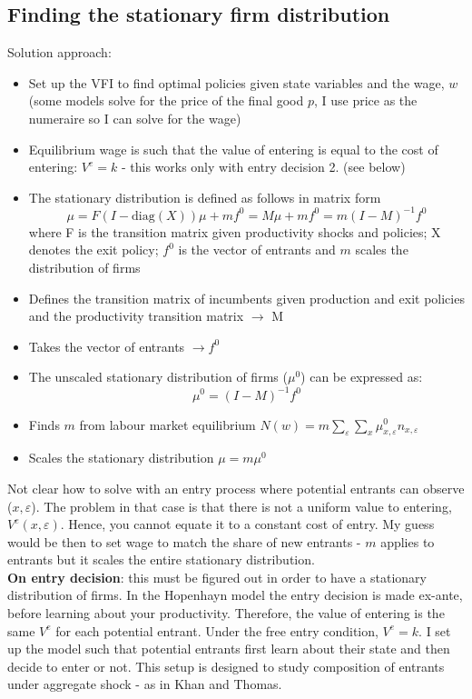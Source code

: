 \documentclass[12pt]{article}
\begin{document}
\subsection*{Finding the stationary firm distribution}
Solution approach:
\begin{itemize} \setlength\itemsep{0em}
    \item Set up the VFI to find optimal policies given state variables and the wage, $w$ (some models solve for the price of the final good $p$, I use price as the numeraire so I can solve for the wage)
    \item Equilibrium wage is such that the value of entering is equal to the cost of entering: $V^e = k$ - this works only with entry decision 2. (see below)
    \item The stationary distribution is defined as follows in matrix form 
       $$ \mu = F(I-\text{diag}(X)) \mu + mf^0 = M\mu + mf^0 = m(I-M)^{-1}f^0 $$
       where F is the transition matrix given productivity shocks and policies; X denotes the exit policy; $f^0$ is the vector of entrants and $m$ scales the distribution of firms
    \item Defines the transition matrix of incumbents given production and exit policies and the productivity transition matrix $\rightarrow$ M
    \item Takes the vector of entrants $\rightarrow f^0$
    \item The unscaled stationary distribution of firms ($\mu^{0}$) can be expressed as: 
        $$\mu^{0}= (I-M)^{-1}f^0$$
    \item Finds $m$ from labour market equilibrium 
        $N(w) = m \sum_\varepsilon \sum_x \mu^{0}_{x, \varepsilon} n_{x, \varepsilon} $
    \item Scales the stationary distribution $\mu = m\mu^0$
\end{itemize}
Not clear how to solve with an entry process where potential entrants can observe ($x,\varepsilon$). The problem in that case is that there is not a uniform value to entering, $V^e(x,\varepsilon)$. Hence, you cannot equate it to a constant cost of entry. My guess would be then to set wage to match the share of new entrants - $m$ applies to entrants but it scales the entire stationary distribution. \vspace{3mm} \\
 \textbf{On entry decision}: this must be figured out in order to have a stationary distribution of firms. In the Hopenhayn model the entry decision is made ex-ante, before learning about your productivity. Therefore, the value of entering is the same $V^e$ for each potential entrant. Under the free entry condition, $V^e = k$. I set up the model such that potential entrants first learn about their state and then decide to enter or not. This setup is designed to study composition of entrants under aggregate shock - as in Khan and Thomas. \vspace{3mm} \\
\end{document}
